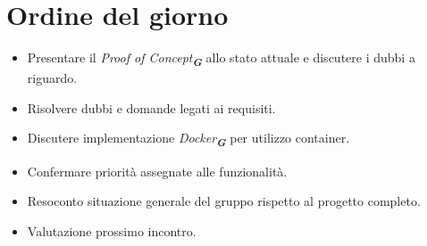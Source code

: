 

\section{Ordine del giorno}

\begin{itemize}
    \item Presentare il \emph{Proof of Concept}\textsubscript{\textbf{\textit{G}}} allo stato attuale e discutere i dubbi a riguardo.
    \item Risolvere dubbi e domande legati ai requisiti.
    \item Discutere implementazione \emph{Docker}\textsubscript{\textbf{\textit{G}}} per utilizzo container.
    \item Confermare priorità assegnate alle funzionalità.
    \item Resoconto situazione generale del gruppo rispetto al progetto completo.
    \item Valutazione prossimo incontro.
\end{itemize}